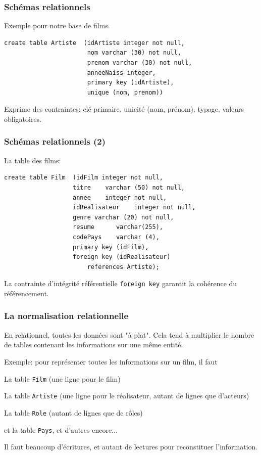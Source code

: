 \begin{frame}[fragile]
\frametitle{Schémas relationnels}

Exemple pour notre base de films.

\vfill
\begin{verbatim}
create table Artiste  (idArtiste integer not null,
                       nom varchar (30) not null,
                       prenom varchar (30) not null,
                       anneeNaiss integer,
                       primary key (idArtiste),
                       unique (nom, prenom))
\end{verbatim}

\vfill

Exprime des \alert{contraintes}: clé primaire, unicité (nom, prénom), typage, valeurs obligatoires.

\end{frame}


\begin{frame}[fragile]
\frametitle{Schémas relationnels (2)}

La table des films:

\vfill
\begin{verbatim}
create table Film  (idFilm integer not null, 
                   titre    varchar (50) not null,
                   annee    integer not null,
                   idRealisateur    integer not null,
                   genre varchar (20) not null,
                   resume      varchar(255),
                   codePays    varchar (4),
                   primary key (idFilm),
                   foreign key (idRealisateur) 
                       references Artiste);
\end{verbatim}

\vfill
La \alert{contrainte d'intégrité référentielle} \texttt{foreign key} garantit la cohérence
du référencement.

\end{frame}


\begin{frame}[fragile]
\frametitle{La normalisation relationnelle}

En relationnel, toutes les données sont "à plat". Cela tend à multiplier le nombre
de tables contenant les informations sur une même entité.

\vfill

Exemple: pour représenter toutes les informations sur un film, il faut

\begin{redbullet}
  \item La table \texttt{Film} (une ligne pour le film)
  \item La table \texttt{Artiste} (une ligne pour le réalisateur, autant de lignes que d'acteurs)
  \item La table \texttt{Role} (autant de lignes que de rôles)
  \item et la table \texttt{Pays}, et d'autres encore...
\end{redbullet}

\vfill

Il faut beaucoup \alert{d'écritures}, et autant de \alert{lectures} pour reconstituer
l'information.

\end{frame}



